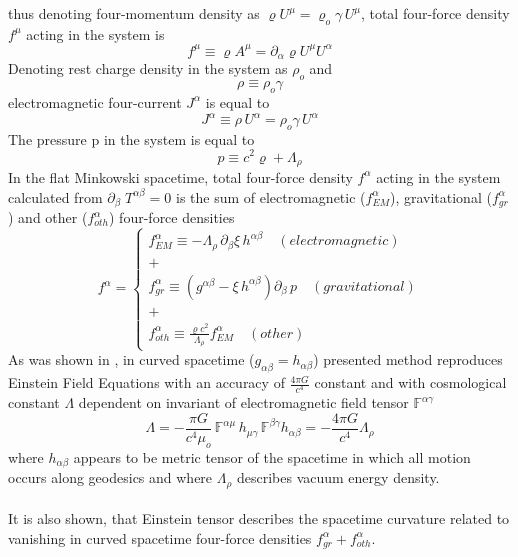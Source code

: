 \documentclass[aps,prx,preprint,groupedaddress,showkeys]{revtex4-2}
\begin{document}
thus denoting four-momentum density as $\varrho U^{\mu} = \varrho_o \gamma \, U^{\mu}$, total four-force density $f^{\mu}$ acting in the system is
\begin{equation} \label{TotFoI}
f^{\mu} \equiv \varrho A^{\mu} = \partial_{\alpha} \varrho U^{\mu} U^{\alpha}
\end{equation}
Denoting rest charge density in the system as $ \rho_o$ and
\begin{equation} \label{RHZERO}
\rho \equiv \rho_o \gamma
\end{equation}
electromagnetic four-current $J^{\alpha}$ is equal to
\begin{equation} \label{EN11}
J^{\alpha} \equiv \rho \, U^{\alpha} = \rho_o \gamma \, U^{\alpha}
\end{equation}
The pressure p in the system is equal to
\begin{equation} \label{Pressure}
p \equiv c^2 \varrho +  \Lambda_{\rho}
\end{equation}
In the flat Minkowski spacetime, total four-force density $f^{\alpha}$ acting in the system calculated from $\partial_{\beta} \; T^{\alpha \beta} =0$ is the sum of electromagnetic ($f^{\alpha}_{EM}$), gravitational ($f^{\alpha}_{gr}$) and other ($f^{\alpha}_{oth}$) four-force densities
\begin{equation} \label{forceDen}
f^{\alpha} = 
\begin{cases} 
f^{\alpha}_{EM} \equiv -\Lambda_{\rho} \, \partial_{\beta} \xi \, h^{\alpha \beta} \quad (electromagnetic) \\
+ \\
f^{\alpha}_{gr} \equiv \left ( g^{\alpha \beta} - \xi \, h^{\alpha \beta}  \right ) \partial_{\beta} \, p \quad (gravitational) \\
+ \\
f^{\alpha}_{oth} \equiv \frac{\varrho c^2}{\Lambda_{\rho}} f^{\alpha}_{EM}  \quad (other)
\end{cases}
\end{equation}
As was shown in \cite{PMofC}, in curved spacetime ($g_{\alpha \beta} =h_{\alpha \beta}$) presented method reproduces Einstein Field Equations with an accuracy of $\frac{4\pi G}{c^4}$ constant and with cosmological constant $\Lambda$ dependent on invariant of electromagnetic field tensor $\mathbb{F}^{\alpha \gamma}$
\begin{equation} \label{CosmoCon}
\Lambda =  - \frac{\pi G}{c^4 \mu_o} \, \mathbb{F}^{\alpha \mu} \, h_{\mu \gamma} \, \mathbb{F}^{ \beta \gamma } h_{\alpha \beta} = - \frac{4\pi G}{c^4} \Lambda_{\rho}
\end{equation}
where $h_{\alpha \beta}$ appears to be metric tensor of the spacetime in which all motion occurs along geodesics and where $\Lambda_{\rho}$ describes vacuum energy density.\\
~\\
It is also shown, that Einstein tensor describes the spacetime curvature related to vanishing in curved spacetime four-force densities $f^{\alpha}_{gr} + f^{\alpha}_{oth}$.
\end{document}
